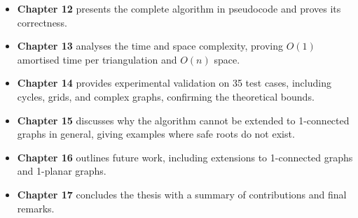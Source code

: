 \begin{itemize}
    \item \textbf{Chapter 12} presents the complete algorithm in pseudocode and proves its correctness.
    
    \item \textbf{Chapter 13} analyses the time and space complexity, proving \(O(1)\) amortised time per triangulation and \(O(n)\) space.
    
    \item \textbf{Chapter 14} provides experimental validation on 35 test cases, including cycles, grids, and complex graphs, confirming the theoretical bounds.
    
    \item \textbf{Chapter 15} discusses why the algorithm cannot be extended to 1-connected graphs in general, giving examples where safe roots do not exist.
    
    \item \textbf{Chapter 16} outlines future work, including extensions to 1-connected graphs and 1-planar graphs.
    
    \item \textbf{Chapter 17} concludes the thesis with a summary of contributions and final remarks.
\end{itemize}